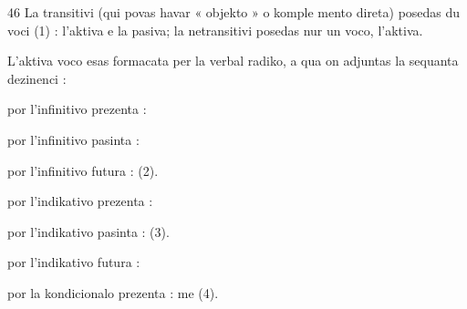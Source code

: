 \begin{VUpage}[50]{46}
La transitivi (qui povas havar « objekto » o komple\cc
mento direta) posedas du voci (1) : l'aktiva e la pasiva;\nl
la netransitivi posedas nur un voco, l'aktiva.

L'aktiva voco esas formacata per la verbal radiko, a qua\nl
on adjuntas la sequanta dezinenci :

\VUblanc{2.85pt}%
 por l'infinitivo prezenta : 

 por l'infinitivo pasinta : 

 por l'infinitivo futura :  (2).

 por l'indikativo prezenta : 

 por l'indikativo pasinta :  (3).

 por l'indikativo futura : 

 por la kondicionalo prezenta : me  (4).
\end{VUpage}

